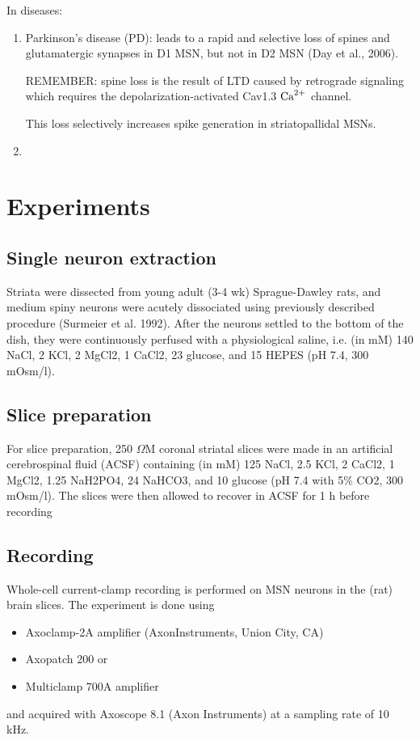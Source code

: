 In diseases:
\begin{enumerate}
  \item Parkinson's disease (PD): leads to a rapid and selective loss of
spines and glutamatergic synapses in D1 MSN, but not in D2 MSN (Day et al.,
2006).

REMEMBER: spine loss is the result of LTD caused by retrograde signaling which
requires the depolarization-activated Cav1.3 ${\text{Ca}^{2+}}$ channel.

This loss selectively increases spike generation in striatopallidal
MSNs.

  \item 
\end{enumerate}

\section{Experiments}

\subsection{Single neuron extraction}

Striata were dissected from young adult (3-4 wk) Sprague-Dawley rats, and medium
spiny neurons were acutely dissociated using previously described procedure
(Surmeier et al. 1992). After the neurons settled to the bottom of the dish,
they were continuously perfused with a physiological saline, i.e.
(in mM) 140 NaCl, 2 KCl, 2 MgCl2, 1 CaCl2, 23 glucose, and 15 HEPES (pH 7.4, 300
mOsm/l).

\subsection{Slice preparation}

For slice preparation, 250 $\Omega$M coronal striatal slices were made in
an artificial cerebrospinal fluid (ACSF) containing (in mM) 125 NaCl,
2.5 KCl, 2 CaCl2, 1 MgCl2, 1.25 NaH2PO4, 24 NaHCO3, and 10
glucose (pH 7.4 with 5\% CO2, 300 mOsm/l). The slices were then
allowed to recover in ACSF for 1 h before recording

\subsection{Recording}

Whole-cell current-clamp recording is performed on MSN neurons in the (rat)
brain slices. The experiment is done using 
\begin{itemize}
  \item  Axoclamp-2A amplifier (AxonInstruments, Union City, CA)  
  
  \item Axopatch 200 or 
  
  \item Multiclamp 700A amplifier
\end{itemize}
and acquired with Axoscope 8.1 (Axon Instruments)
at a sampling rate of 10 kHz.

